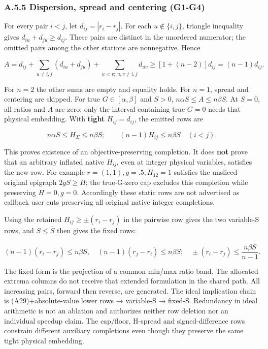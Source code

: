 \documentclass[
  american,
  11pt,
]{article}
\begin{document}
\subsubsection{A.5.5 Dispersion, spread and centering
(G1-G4)}\label{a.5.5-dispersion-spread-and-centering-g1-g4}

For every pair \(i<j\), let \(d_{ij}=|r_i-r_j|\). For each
\(u\notin\{i,j\}\), triangle inequality gives
\(d_{iu}+d_{ju}\ge d_{ij}\). These pairs are distinct in the unordered
numerator; the omitted pairs among the other stations are nonnegative.
Hence

\[
A=d_{ij}+\sum_{u\ne i,j}(d_{iu}+d_{ju})+\sum_{u<v;\ u,v\ne i,j}d_{uv}
\ge[1+(n-2)]d_{ij}=(n-1)d_{ij}.
\tag{A28}
\]

For \(n=2\) the other sums are empty and equality holds. For \(n=1\),
spread and centering are skipped. For true \(G\in[\alpha,\beta]\) and
\(S>0\), \(n\alpha S\le A\le n\beta S\). At \(S=0\), all ratios and
\(A\) are zero; only the interval containing true \(G=0\) needs that
physical embedding. With \textbf{tight} \(H_{ij}=d_{ij}\), the emitted
rows are

\[
n\alpha S\le H_\Sigma\le n\beta S;\qquad
(n-1)H_{ij}\le n\beta S\quad(i<j).
\tag{A29}
\]

This proves existence of an objective-preserving completion. It does
\textbf{not} prove that an arbitrary inflated native \(H_{ij}\), even at
integer physical variables, satisfies the new row. For example
\(r=(1,1),g=.5,H_{12}=1\) satisfies the unsliced original epigraph
\(2gS\ge H\); the true-G-zero cap excludes this completion while
preserving \(H=0,g=0\). Accordingly these static rows are not advertised
as callback user cuts preserving all original native integer
completions.

Using the retained \(H_{ij}\ge\pm(r_i-r_j)\) in the pairwise row gives
the two variable-S rows, and \(S\le\bar S\) then gives the fixed rows:

\[
(n-1)(r_i-r_j)\le n\beta S,\quad(n-1)(r_j-r_i)\le n\beta S;
\quad \pm(r_i-r_j)\le\frac{n\beta\bar S}{n-1}.
\tag{A30}
\]

The fixed form is the projection of a common min/max ratio band. The
allocated extrema columns do not receive that extended formulation in
the shared path. All increasing pairs, forward then reverse, are
generated. The ideal implication chain is (A29)+absolute-value lower
rows → variable-S → fixed-S. Redundancy in ideal arithmetic is not an
ablation and authorizes neither row deletion nor an individual speedup
claim. The cap/floor, H-spread and signed-difference rows constrain
different auxiliary completions even though they preserve the same tight
physical embedding.
\end{document}
